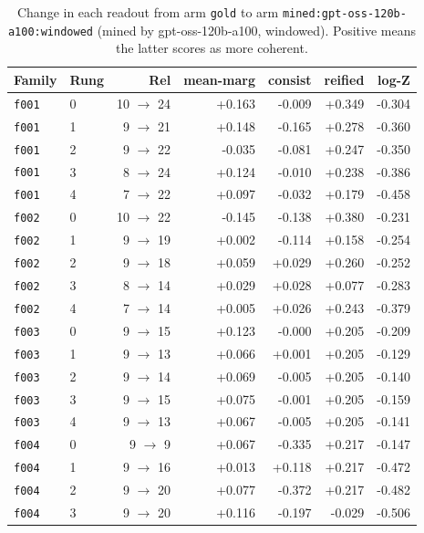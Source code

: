 \documentclass[11pt]{article}
\begin{document}
\begin{table}[htbp]
\centering
\small
\caption{Change in each readout from arm \texttt{gold} to arm \texttt{mined:gpt-oss-120b-a100:windowed} (mined by gpt-oss-120b-a100, windowed). Positive means the latter scores as more coherent.}
\label{tab:arm-delta-gold-mined-gpt-oss-120b-a100-windowed}
\begin{tabular}{llrrrrr}
\toprule
Family & Rung & Rel & \textbf{mean-marg} & \textbf{consist} & \textbf{reified} & \textbf{log-Z} \\
\midrule
\texttt{f001} & 0 & 10 $\to$ 24 & +0.163 & -0.009 & +0.349 & -0.304 \\
\texttt{f001} & 1 & 9 $\to$ 21 & +0.148 & -0.165 & +0.278 & -0.360 \\
\texttt{f001} & 2 & 9 $\to$ 22 & -0.035 & -0.081 & +0.247 & -0.350 \\
\texttt{f001} & 3 & 8 $\to$ 24 & +0.124 & -0.010 & +0.238 & -0.386 \\
\texttt{f001} & 4 & 7 $\to$ 22 & +0.097 & -0.032 & +0.179 & -0.458 \\
\texttt{f002} & 0 & 10 $\to$ 22 & -0.145 & -0.138 & +0.380 & -0.231 \\
\texttt{f002} & 1 & 9 $\to$ 19 & +0.002 & -0.114 & +0.158 & -0.254 \\
\texttt{f002} & 2 & 9 $\to$ 18 & +0.059 & +0.029 & +0.260 & -0.252 \\
\texttt{f002} & 3 & 8 $\to$ 14 & +0.029 & +0.028 & +0.077 & -0.283 \\
\texttt{f002} & 4 & 7 $\to$ 14 & +0.005 & +0.026 & +0.243 & -0.379 \\
\texttt{f003} & 0 & 9 $\to$ 15 & +0.123 & -0.000 & +0.205 & -0.209 \\
\texttt{f003} & 1 & 9 $\to$ 13 & +0.066 & +0.001 & +0.205 & -0.129 \\
\texttt{f003} & 2 & 9 $\to$ 14 & +0.069 & -0.005 & +0.205 & -0.140 \\
\texttt{f003} & 3 & 9 $\to$ 15 & +0.075 & -0.001 & +0.205 & -0.159 \\
\texttt{f003} & 4 & 9 $\to$ 13 & +0.067 & -0.005 & +0.205 & -0.141 \\
\texttt{f004} & 0 & 9 $\to$ 9 & +0.067 & -0.335 & +0.217 & -0.147 \\
\texttt{f004} & 1 & 9 $\to$ 16 & +0.013 & +0.118 & +0.217 & -0.472 \\
\texttt{f004} & 2 & 9 $\to$ 20 & +0.077 & -0.372 & +0.217 & -0.482 \\
\texttt{f004} & 3 & 9 $\to$ 20 & +0.116 & -0.197 & -0.029 & -0.506 \\

\end{tabular}
\end{table}
\end{document}
